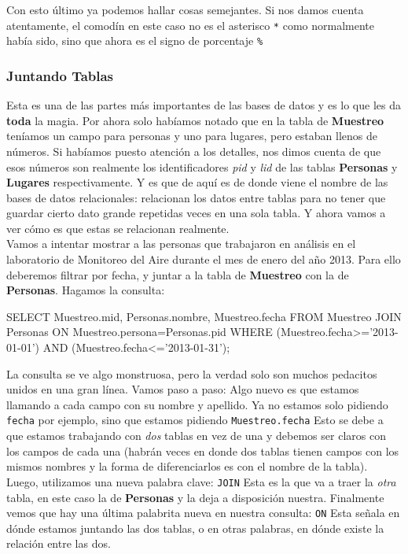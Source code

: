 \documentclass[10pt,letterpaper]{article}
\newcommand{\inlinecode}[1]{
\colorbox{light-gray}{\texttt{#1}}
}
\newenvironment{Code}
{
\begin{lrbox}{\selvestebox}%
\begin{minipage}{\dimexpr\columnwidth-2\fboxsep\relax}
\fontfamily{\ttdefault}\selectfont
}
{\end{minipage}\end{lrbox}%
\begin{center}
\colorbox{light-gray}{\usebox{\selvestebox}}
\end{center}
}
\begin{document}
Con esto \'ultimo ya podemos hallar cosas semejantes. Si nos damos cuenta atentamente, el comod\'in en este caso no es el asterisco \inlinecode{*} como normalmente hab\'ia sido, sino que ahora es el signo de porcentaje \inlinecode{\%}

\subsubsection{Juntando Tablas}
Esta es una de las partes m\'as importantes de las bases de datos y es lo que les da \textbf{toda} la magia. Por ahora solo hab\'iamos notado que en la tabla de \textbf{Muestreo} ten\'iamos un campo para personas y uno para lugares, pero estaban llenos de n\'umeros. Si hab\'iamos puesto atenci\'on a los detalles, nos dimos cuenta de que esos n\'umeros son realmente los identificadores \emph{pid} y \emph{lid} de las tablas \textbf{Personas} y \textbf{Lugares} respectivamente. Y es que de aqu\'i es de donde viene el nombre de las bases de datos relacionales: relacionan los datos entre tablas para no tener que guardar cierto dato grande repetidas veces en una sola tabla. Y ahora vamos a ver c\'omo es que estas se relacionan realmente.\\

Vamos a intentar mostrar a las personas que trabajaron en an\'alisis en el laboratorio de Monitoreo del Aire durante el mes de enero del a\~no 2013. Para ello deberemos filtrar por fecha, y juntar a la tabla de \textbf{Muestreo} con la de \textbf{Personas}. Hagamos la consulta:

\begin{Code}
SELECT Muestreo.mid, Personas.nombre, Muestreo.fecha FROM Muestreo JOIN Personas ON Muestreo.persona=Personas.pid WHERE (Muestreo.fecha>='2013-01-01') AND (Muestreo.fecha<='2013-01-31');
\end{Code}

La consulta se ve algo monstruosa, pero la verdad solo son muchos pedacitos unidos en una gran l\'inea. Vamos paso a paso: Algo nuevo es que estamos llamando a cada campo con su nombre y apellido. Ya no estamos solo pidiendo \inlinecode{fecha} por ejemplo, sino que estamos pidiendo \inlinecode{Muestreo.fecha} Esto se debe a que estamos trabajando con \emph{dos} tablas en vez de una y debemos ser claros con los campos de cada una (habr\'an veces en donde dos tablas tienen campos con los mismos nombres y la forma de diferenciarlos es con el nombre de la tabla). Luego, utilizamos una nueva palabra clave: \inlinecode{JOIN} Esta es la que va a traer la \emph{otra} tabla, en este caso la de \textbf{Personas} y la deja a disposici\'on nuestra. Finalmente vemos que hay una \'ultima palabrita nueva en nuestra consulta: \inlinecode{ON} Esta se\~nala en d\'onde estamos juntando las dos tablas, o en otras palabras, en d\'onde existe la relaci\'on entre las dos.\\
\end{document}
